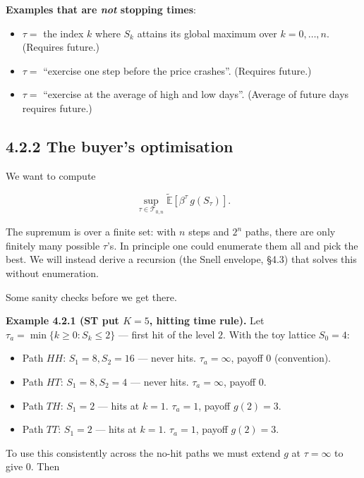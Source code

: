 \documentclass[
  10pt,
  twoside]{book}
\providecommand{\tightlist}{%
  \setlength{\itemsep}{0pt}\setlength{\parskip}{0pt}}
\begin{document}
\textbf{Examples that are \emph{not} stopping times}:

\begin{itemize}
\tightlist
\item
  \(\tau =\) the index \(k\) where \(S_k\) attains its global maximum
  over \(k = 0, \dots, n\). (Requires future.)
\item
  \(\tau =\) ``exercise one step before the price crashes''. (Requires
  future.)
\item
  \(\tau =\) ``exercise at the average of high and low days''. (Average
  of future days requires future.)
\end{itemize}

\subsection{4.2.2 The buyer's
optimisation}\label{the-buyers-optimisation}

We want to compute

\[\sup_{\tau \in \mathcal{T}_{0,n}} \tilde{\mathbb{E}}\!\left[\beta^\tau\, g(S_\tau)\right].\]

The supremum is over a finite set: with \(n\) steps and \(2^n\) paths,
there are only finitely many possible \(\tau\)'s. In principle one could
enumerate them all and pick the best. We will instead derive a recursion
(the Snell envelope, §4.3) that solves this without enumeration.

Some sanity checks before we get there.

\textbf{Example 4.2.1 (ST put \(K = 5\), hitting time rule).} Let
\(\tau_a = \min\{k \ge 0 : S_k \le 2\}\) --- first hit of the level
\(2\). With the toy lattice \(S_0 = 4\):

\begin{itemize}
\tightlist
\item
  Path \(HH\): \(S_1 = 8, S_2 = 16\) --- never hits.
  \(\tau_a = \infty\), payoff \(0\) (convention).
\item
  Path \(HT\): \(S_1 = 8, S_2 = 4\) --- never hits. \(\tau_a = \infty\),
  payoff \(0\).
\item
  Path \(TH\): \(S_1 = 2\) --- hits at \(k = 1\). \(\tau_a = 1\), payoff
  \(g(2) = 3\).
\item
  Path \(TT\): \(S_1 = 2\) --- hits at \(k = 1\). \(\tau_a = 1\), payoff
  \(g(2) = 3\).
\end{itemize}

To use this consistently across the no-hit paths we must extend \(g\) at
\(\tau = \infty\) to give \(0\). Then
\end{document}
